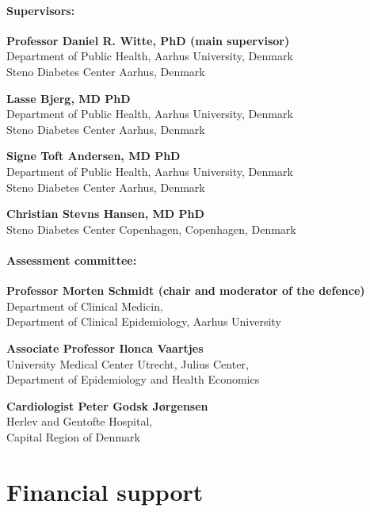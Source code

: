 \documentclass[
  a4paper,
  headsepline=true,
  open=left]{scrbook}
\begin{document}
\hypertarget{supervisors}{%
\subsubsection*{Supervisors:}\label{supervisors}}

\textbf{Professor Daniel R. Witte, PhD (main supervisor)}\\
Department of Public Health, Aarhus University, Denmark\\
Steno Diabetes Center Aarhus, Denmark

\textbf{Lasse Bjerg, MD PhD}\\
Department of Public Health, Aarhus University, Denmark\\
Steno Diabetes Center Aarhus, Denmark

\textbf{Signe Toft Andersen, MD PhD}\\
Department of Public Health, Aarhus University, Denmark\\
Steno Diabetes Center Aarhus, Denmark

\textbf{Christian Stevns Hansen, MD PhD}\\
Steno Diabetes Center Copenhagen, Copenhagen, Denmark

\hypertarget{assessment-committee}{%
\subsubsection*{Assessment committee:}\label{assessment-committee}}

\textbf{Professor Morten Schmidt (chair and moderator of the defence)}\\
Department of Clinical Medicin,\\
Department of Clinical Epidemiology, Aarhus University

\textbf{Associate Professor Ilonca Vaartjes}\\
University Medical Center Utrecht, Julius Center,\\
Department of Epidemiology and Health Economics

\textbf{Cardiologist Peter Godsk Jørgensen}\\
Herlev and Gentofte Hospital,\\
Capital Region of Denmark


\hypertarget{financial-support}{%
\chapter*{Financial support}\label{financial-support}}
\end{document}
